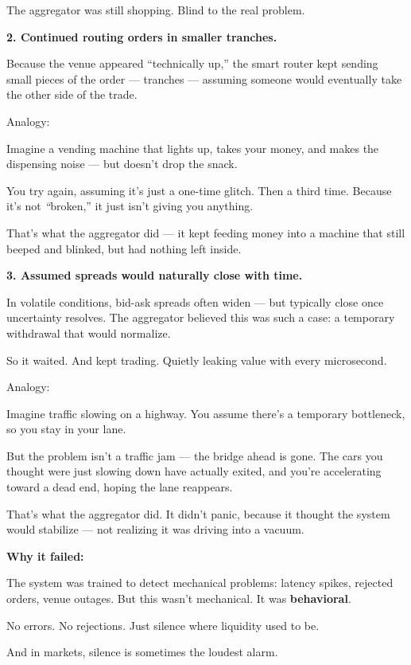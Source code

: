 The aggregator was still shopping. Blind to the real problem.

\textbf{2. Continued routing orders in smaller tranches.}

Because the venue appeared “technically up,” the smart router kept sending small pieces of the order — tranches — 
assuming someone would eventually take the other side of the trade.

Analogy:

Imagine a vending machine that lights up, takes your money, and makes the dispensing noise — but doesn’t drop the snack.

You try again, assuming it’s just a one-time glitch. Then a third time. Because it’s not \textit“broken,” it just isn’t 
giving you anything.

That’s what the aggregator did — it kept feeding money into a machine that still beeped and blinked, but had nothing 
left inside.

\textbf{3. Assumed spreads would naturally close with time.}

In volatile conditions, bid-ask spreads often widen — but typically close once uncertainty resolves. The aggregator 
believed this was such a case: a temporary withdrawal that would normalize.

So it waited. And kept trading. Quietly leaking value with every microsecond.

Analogy:

Imagine traffic slowing on a highway. You assume there’s a temporary bottleneck, so you stay in your lane.

But the problem isn’t a traffic jam — the bridge ahead is gone. The cars you thought were just slowing down have 
actually exited, and you’re accelerating toward a dead end, hoping the lane reappears.

That’s what the aggregator did. It didn’t panic, because it thought the system would stabilize — not realizing it 
was driving into a vacuum.

\textbf{Why it failed:}

The system was trained to detect mechanical problems: latency spikes, rejected orders, venue outages. But this 
wasn’t mechanical. It was \textbf{behavioral}.

No errors. No rejections. Just silence where liquidity used to be.

And in markets, silence is sometimes the loudest alarm.


